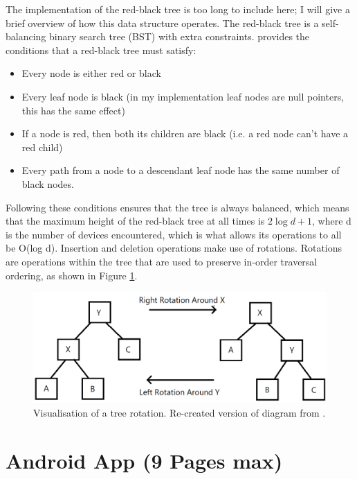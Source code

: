 \documentclass{l4proj}
\begin{document}
The implementation of the red-black tree is too long to include here; I will give a brief overview of how this data structure operates. The red-black tree is a self-balancing binary search tree (BST) with extra constraints. \citet{morris_data_1998} provides the conditions that a red-black tree must satisfy:

\begin{itemize}
    \item Every node is either red or black
    \item Every leaf node is black (in my implementation leaf nodes are null pointers, this has the same effect)
    \item If a node is red, then both its children are black (i.e. a red node can't have a red child)
    \item Every path from a node to a descendant leaf node has the same number of black nodes.
\end{itemize}

Following these conditions ensures that the tree is always balanced, which means that the maximum height of the red-black tree at all times is $2\log{d + 1}$, where d is the number of devices encountered, which is what allows its operations to all be O(log d). Insertion and deletion operations make use of rotations. Rotations are operations within the tree that are used to preserve in-order traversal ordering, as shown in Figure \ref{fig:tree_rotation}.

\begin{figure}[!htb]
    \centering
    \includegraphics[width=0.8\linewidth]{images/rbtree_rotation.png}

    \caption{ Visualisation of a tree rotation. Re-created version of diagram from \citep{morris_data_1998}. }

    \label{fig:tree_rotation}
\end{figure}

\section{Android App (9 Pages max)}
\end{document}
